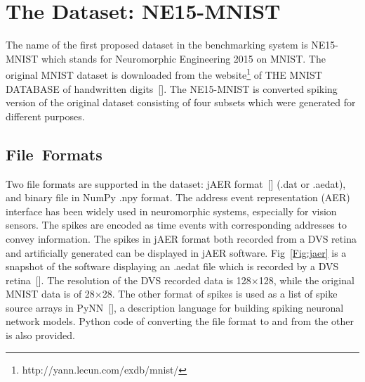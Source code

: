 \section{The Dataset: NE15-MNIST}
\label{sec:data}
The name of the first proposed dataset in the benchmarking system is NE15-MNIST which stands for Neuromorphic Engineering 2015 on MNIST.
The original MNIST dataset is downloaded from the website\footnote{http://yann.lecun.com/exdb/mnist/} of THE MNIST DATABASE of handwritten digits~[\cite{lecun_gradient-based_1998}].
The NE15-MNIST is converted spiking version of the original dataset consisting of four subsets which were generated for different purposes.
\subsection{File~Formats}

Two file formats are supported in the dataset: jAER format~[\cite{delbruck2008frame}] (.dat or .aedat), and binary file in NumPy .npy format.
The  address event representation (AER) interface has been widely used in neuromorphic systems, especially for vision sensors.
The spikes are encoded as time events with corresponding addresses to convey information.
The spikes in jAER format both recorded from a DVS retina and artificially generated can be displayed in jAER software.
Fig~\ref{Fig:jaer} is a snapshot of the software displaying an .aedat file which is recorded by a DVS retina~[\cite{serrano-gotarredona_128_2013}].
The resolution of the DVS recorded data is 128$\times$128, while the original MNIST data is of 28$\times$28.
The other format of spikes is used as a list of spike source arrays in PyNN~[\cite{davison2008pynn}], a description language for building spiking neuronal network models.
Python code of converting the file format to and from the other is also provided.

